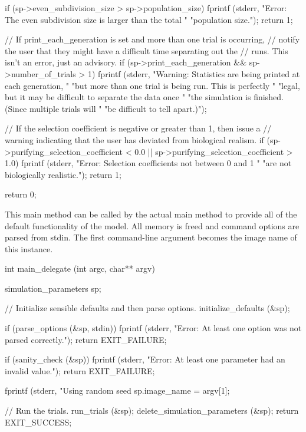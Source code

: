 \documentclass{article}
\begin{document}
\begin{ccode}
{{    if (sp->even_subdivision_size > sp->population_size) {
      fprintf (stderr, "Error: The even subdivision size is larger than the total "
                   "population size.\n");
      return 1;
    }
  }

  // If print_each_generation is set and more than one trial is occurring,
  // notify the user that they might have a difficult time separating out the
  // runs. This isn’t an error, just an advisory.
  if (sp->print_each_generation && sp->number_of_trials > 1)
    fprintf (stderr, "Warning: Statistics are being printed at each generation, "
                 "but more than one trial is being run. This is perfectly "
                 "legal, but it may be difficult to separate the data once "
                 "the simulation is finished. (Since multiple trials will "
                 "be difficult to tell apart.)\n");

  // If the selection coefficient is negative or greater than 1, then issue a
  // warning indicating that the user has deviated from biological realism.
  if (sp->purifying_selection_coefficient < 0.0 ||
      sp->purifying_selection_coefficient > 1.0) {
    fprintf (stderr, "Error: Selection coefficients not between 0 and 1 "
                 "are not biologically realistic.\n");
    return 1;
  }

  return 0;
}
\end{ccode}

     This main method can be called by the actual main method to provide all of
     the default functionality of the model. All memory is freed and command
     options are parsed from stdin. The first command-line argument becomes the
     image name of this instance.

\begin{ccode}
int main_delegate (int argc, char** argv) {
  simulation_parameters sp;

  // Initialize sensible defaults and then parse options.
  initialize_defaults (&sp);

  if (parse_options (&sp, stdin)) {
    fprintf (stderr, "Error: At least one option was not parsed correctly.\n");
    return EXIT_FAILURE;
  }

  if (sanity_check (&sp)) {
    fprintf (stderr, "Error: At least one parameter had an invalid value.\n");
    return EXIT_FAILURE;
  }

  fprintf (stderr, "Using random seed %
  sp.image_name = argv[1];

  // Run the trials.
  run_trials (&sp);
  delete_simulation_parameters (&sp);
  return EXIT_SUCCESS;
}
\end{ccode}
\end{document}
